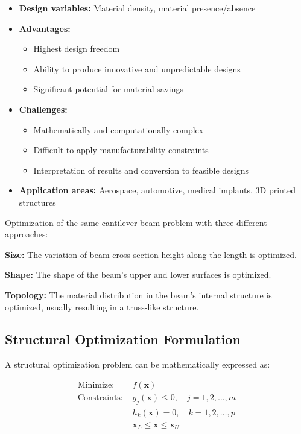 \begin{itemize}
    \item \textbf{Design variables:} Material density, material presence/absence
    \item \textbf{Advantages:} 
    \begin{itemize}
        \item Highest design freedom
        \item Ability to produce innovative and unpredictable designs
        \item Significant potential for material savings
    \end{itemize}
    \item \textbf{Challenges:} 
    \begin{itemize}
        \item Mathematically and computationally complex
        \item Difficult to apply manufacturability constraints
        \item Interpretation of results and conversion to feasible designs
    \end{itemize}
    \item \textbf{Application areas:} Aerospace, automotive, medical implants, 3D printed structures
\end{itemize}

\begin{tcolorbox}[title=Example: Cantilever Beam Optimization]
Optimization of the same cantilever beam problem with three different approaches:

\textbf{Size:} The variation of beam cross-section height along the length is optimized.

\textbf{Shape:} The shape of the beam's upper and lower surfaces is optimized.

\textbf{Topology:} The material distribution in the beam's internal structure is optimized, usually resulting in a truss-like structure.
\end{tcolorbox}

\subsection{Structural Optimization Formulation}

A structural optimization problem can be mathematically expressed as:

\begin{align}
\text{Minimize: } & f(\mathbf{x}) \\
\text{Constraints: } & g_j(\mathbf{x}) \leq 0, \quad j = 1, 2, \ldots, m \\
& h_k(\mathbf{x}) = 0, \quad k = 1, 2, \ldots, p \\
& \mathbf{x}_L \leq \mathbf{x} \leq \mathbf{x}_U
\end{align}

